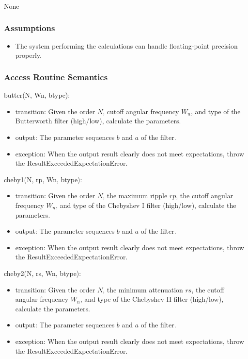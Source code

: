 \documentclass[12pt, titlepage]{article}
\begin{document}
None

\subsubsection{Assumptions}

\begin{itemize}
\item The system performing the calculations can handle floating-point precision
properly.
\end{itemize}

\subsubsection{Access Routine Semantics}

\noindent butter(N, Wn, btype):
\begin{itemize}
\item transition: Given the order $N$, cutoff angular frequency $W_n$, and type
of the Butterworth filter (high/low), calculate the parameters.
\item output: The parameter sequences $b$ and $a$ of the filter.
\item exception: When the output result clearly does not meet expectations,
throw the ResultExceededExpectationError.
\end{itemize}

\noindent cheby1(N, rp, Wn, btype):
\begin{itemize}
\item transition: Given the order $N$, the maximum ripple $rp$, the cutoff
angular frequency $W_n$, and type of the Chebyshev I filter (high/low),
calculate the parameters.
\item output: The parameter sequences $b$ and $a$ of the filter.
\item exception: When the output result clearly does not meet expectations,
throw the ResultExceededExpectationError.
\end{itemize}

\noindent cheby2(N, rs, Wn, btype):
\begin{itemize}
\item transition: Given the order $N$, the minimum attenuation $rs$, the cutoff
angular frequency $W_n$, and type of the Chebyshev II filter (high/low),
calculate the parameters.
\item output: The parameter sequences $b$ and $a$ of the filter.
\item exception: When the output result clearly does not meet expectations,
throw the ResultExceededExpectationError.
\end{itemize}
\end{document}
